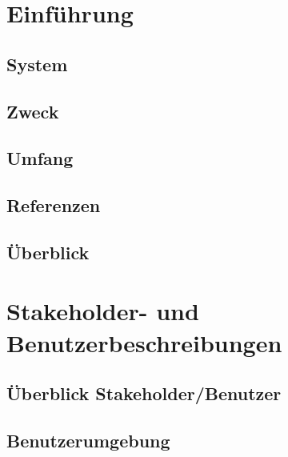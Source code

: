\documentclass[a4paper,12pt,twoside]{scrreprt}
\begin{document}
    \clearpage
    \listoffigures

    \clearpage
    \listoftables



    \chapter{Einführung}
    \section{System}
        
    \section{Zweck}
        
    \section{Umfang}
        
    \section{Referenzen}
        
    \section{Überblick}
        


    \chapter{Stakeholder- und Benutzerbeschreibungen}
    \section{Überblick Stakeholder/Benutzer}
    \section{Benutzerumgebung}
    
\end{document}
